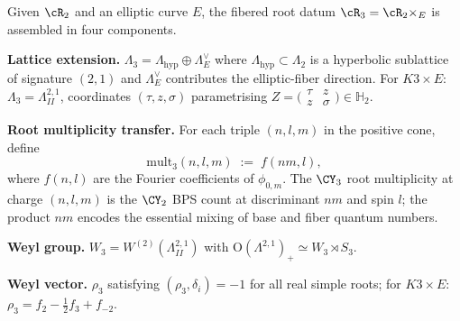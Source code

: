 \begin{construction}[Fibered root datum \texorpdfstring{$\cR_3 = \cR_2 \times_E$}{R-3 = R-2 x-E}]
\label{constr:thy-fibration-fibered-root-datum}
Given $\cR_2$ and an elliptic curve $E$, the fibered root datum $\cR_3 = \cR_2 \times_E$ is assembled in four components.

\medskip\noindent\textbf{Lattice extension.} $\Lambda_3 = \Lambda_{\mathrm{hyp}} \oplus \Lambda_E^\vee$ where $\Lambda_{\mathrm{hyp}} \subset \Lambda_2$ is a hyperbolic sublattice of signature $(2,1)$ and $\Lambda_E^\vee$ contributes the elliptic-fiber direction. For $K3 \times E$: $\Lambda_3 = \Lambda^{2,1}_{II}$, coordinates $(\tau, z, \sigma)$ parametrising $Z = \bigl(\begin{smallmatrix}\tau & z \\ z & \sigma\end{smallmatrix}\bigr) \in \mathbb{H}_2$.

\medskip\noindent\textbf{Root multiplicity transfer.} For each triple $(n,l,m)$ in the positive cone, define
\begin{equation}
\label{eq:thy-fibration-mult-transfer}
 \mathrm{mult}_3(n, l, m) \;:=\; f(nm, l),
\end{equation}
where $f(n,l)$ are the Fourier coefficients of $\phi_{0,m}$. The $\CY_3$ root multiplicity at charge $(n,l,m)$ is the $\CY_2$ BPS count at discriminant $nm$ and spin $l$; the product $nm$ encodes the essential mixing of base and fiber quantum numbers.

\medskip\noindent\textbf{Weyl group.} $W_3 = W^{(2)}(\Lambda^{2,1}_{II})$ with $\mathrm{O}(\Lambda^{2,1})_+ \simeq W_3 \rtimes S_3$.

\medskip\noindent\textbf{Weyl vector.} $\rho_3$ satisfying $(\rho_3, \delta_i) = -1$ for all real simple roots; for $K3 \times E$: $\rho_3 = f_2 - \tfrac{1}{2}f_3 + f_{-2}$.
\end{construction}

